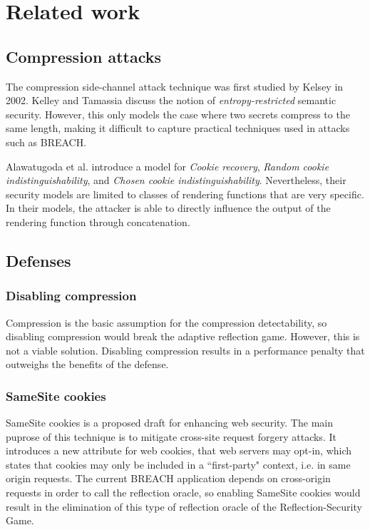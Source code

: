 \section{Related work}\label{sec:related}

\subsection{Compression attacks}

The compression side-channel attack technique was first studied by Kelsey
\cite{kelsey2002compression} in 2002. Kelley and Tamassia\cite{kelley2014secure}
discuss the notion of \textit{entropy-restricted} semantic security. However,
this only models the case where two secrets compress to the same length, making
it difficult to capture practical techniques used in attacks such as BREACH.

Alawatugoda et al. \cite{alawatugoda2015protecting} introduce a model for \textit{Cookie recovery},
\textit{Random cookie indistinguishability}, and \textit{Chosen cookie indistinguishability}.
Nevertheless, their security models are limited to classes of rendering functions
that are very specific. In their models, the attacker is able to directly influence
the output of the rendering function through concatenation.

\subsection{Defenses}

\subsubsection{Disabling compression}\label{subsec:disablecom}
Compression is the basic assumption for the compression detectability, so disabling
compression would break the adaptive reflection game. However, this is not a
viable solution. Disabling compression results in a performance penalty that
outweighs the benefits of the defense.

\subsubsection{SameSite cookies}\label{subsec:samesite}
SameSite cookies \cite{mwest2015firstparty} is a proposed draft for enhancing
web security. The main puprose of this technique is to mitigate cross-site
request forgery attacks. It introduces a new attribute for web cookies, that web
servers may opt-in, which states that cookies may only be included in a
``first-party" context, i.e. in same origin requests. The current BREACH
application depends on cross-origin requests in order to call the reflection
oracle, so enabling SameSite cookies would result in the elimination of this
type of reflection oracle of the Reflection-Security Game.

